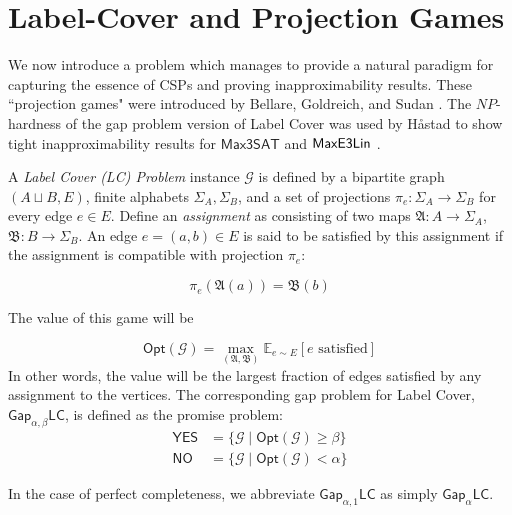 \section{Label-Cover and Projection Games}
We now introduce a problem which manages to provide a natural paradigm for capturing the essence of CSPs and proving inapproximability results. These ``projection games" were introduced by Bellare, Goldreich, and Sudan \cite{bellare1998free}. The $NP$-hardness of the gap problem version of Label Cover was used by H\aa stad to show tight inapproximability results for $\mathsf{Max3SAT}$ and $\mathsf{MaxE3Lin}$ \cite{haastad2001some}.

\begin{definition}
A \emph{Label Cover (LC) Problem} instance $\mathcal{G}$ is defined by a bipartite graph $(A \sqcup B,E)$, finite alphabets $\Sigma_A, \Sigma_B$, and a set of projections $\pi_e:\Sigma_A \rightarrow \Sigma_B$ for every edge $e \in E$. Define an \emph{assignment} as consisting of two maps $\mathfrak{A}: A \rightarrow \Sigma_A$, $\mathfrak{B}: B \rightarrow \Sigma_B$. An edge $e = (a,b) \in E$ is said to be satisfied by this assignment if the assignment is compatible with projection $\pi_e$:

\begin{equation}
  \pi_e(\mathfrak{A}(a)) = \mathfrak{B}(b)
\end{equation}

The value of this game will be

\begin{equation} \label{optvalLC}
  \mathsf{Opt}(\mathcal{G}) = \max_{(\mathfrak{A},\mathfrak{B})} \mathbb{E}_{e \sim E}[e \text{ satisfied}]
\end{equation}
In other words, the value will be the largest fraction of edges satisfied by any assignment to the vertices. The corresponding gap problem for Label Cover, $\mathsf{Gap}_{\alpha,\beta}\mathsf{LC}$, is defined as the promise problem:
%
\begin{align*}
    \mathsf{YES} & = \{\mathcal{G} \mid \mathsf{Opt}(\mathcal{G}) \geq \beta\} \\
    \mathsf{NO} & = \{\mathcal{G} \mid \mathsf{Opt}(\mathcal{G}) < \alpha \}
\end{align*}

In the case of perfect completeness, we abbreviate $\mathsf{Gap}_{\alpha,1}\mathsf{LC}$ as simply $\mathsf{Gap}_{\alpha}\mathsf{LC}$.
\end{definition}

